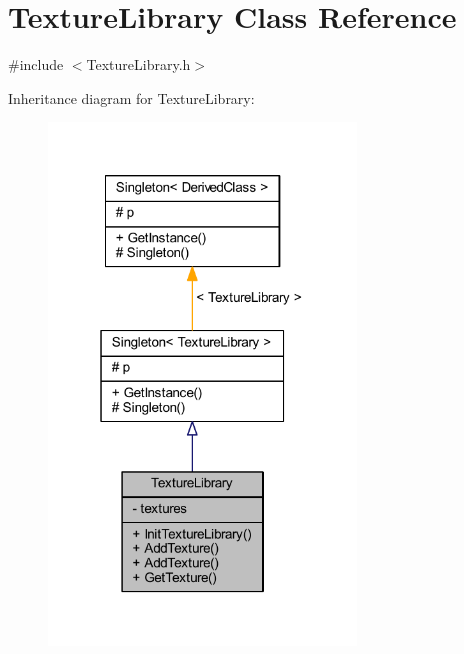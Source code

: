 \hypertarget{class_texture_library}{}\section{Texture\+Library Class Reference}
\label{class_texture_library}


{\ttfamily \#include $<$Texture\+Library.\+h$>$}



Inheritance diagram for Texture\+Library\+:\nopagebreak
\begin{figure}[H]
\begin{center}
\leavevmode
\includegraphics[width=232pt]{class_texture_library__inherit__graph}
\end{center}
\end{figure}


